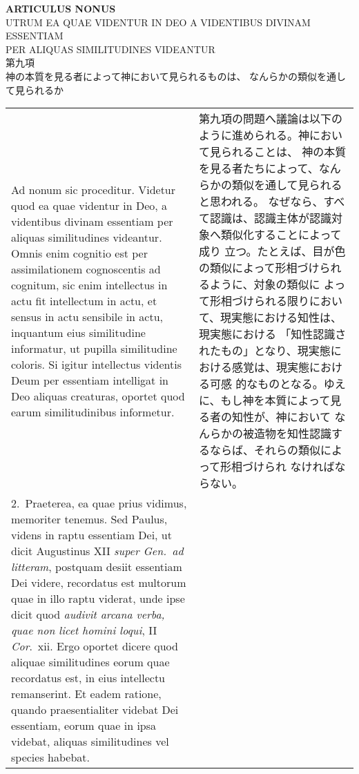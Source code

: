 \documentclass[10pt]{jsarticle} %
\begin{document}
\begin{center}
 {\Large {\bf ARTICULUS NONUS}}\\{\large UTRUM EA QUAE VIDENTUR IN
DEO A VIDENTIBUS DIVINAM ESSENTIAM\\PER ALIQUAS SIMILITUDINES
VIDEANTUR\\第九項\\神の本質を見る者によって神において見られるものは、
なんらかの類似を通して見られるか}

\end{center} 

\begin{longtable}{p{21em}p{21em}}

{\sc Ad nonum sic proceditur}. Videtur quod ea quae videntur in Deo, a
videntibus divinam essentiam per aliquas similitudines
videantur. Omnis enim cognitio est per assimilationem cognoscentis ad
cognitum, sic enim intellectus in actu fit intellectum in actu, et
sensus in actu sensibile in actu, inquantum eius similitudine
informatur, ut pupilla similitudine coloris. Si igitur intellectus
videntis Deum per essentiam intelligat in Deo aliquas creaturas,
oportet quod earum similitudinibus informetur.


&

第九項の問題へ議論は以下のように進められる。神において見られることは、
神の本質を見る者たちによって、なんらかの類似を通して見られると思われる。
なぜなら、すべて認識は、認識主体が認識対象へ類似化することによって成り
立つ。たとえば、目が色の類似によって形相づけられるように、対象の類似に
よって形相づけられる限りにおいて、現実態における知性は、現実態における
「知性認識されたもの」となり、現実態における感覚は、現実態における可感
的なものとなる。ゆえに、もし神を本質によって見る者の知性が、神において
なんらかの被造物を知性認識するならば、それらの類似によって形相づけられ
なければならない。


\\


2.~{\sc Praeterea}, ea quae prius vidimus, memoriter tenemus. Sed
 Paulus, videns in raptu essentiam Dei, ut dicit Augustinus XII {\it
 super Gen.\ ad litteram}, postquam desiit essentiam Dei videre,
 recordatus est multorum quae in illo raptu viderat, unde ipse dicit
 quod {\it audivit arcana verba, quae non licet homini loqui}, II {\it
 Cor}.\ {\sc xii}. Ergo oportet dicere quod aliquae similitudines
 eorum quae recordatus est, in eius intellectu remanserint. Et eadem
 ratione, quando praesentialiter videbat Dei essentiam, eorum quae in
 ipsa videbat, aliquas similitudines vel species habebat.



\end{longtable}
\end{document}
